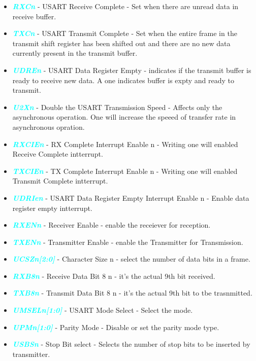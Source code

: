 \documentclass{article}
\newcommand{\bitFormat}[1]{\emph{\textbf{\textcolor{cyan}{#1}}}}
\begin{document}
\begin{itemize}
    \item \bitFormat{RXCn} - USART Receive Complete - Set when there are unread data in receive buffer.
    \item \bitFormat{TXCn} - USART Transmit Complete - Set when the entire frame in the transmit shift register has been shifted out and there are no new data currently present in the transmit buffer.
    \item \bitFormat{UDREn} - USART Data Register Empty - indicates if the transmit buffer is ready to receive new data. A one indicates buffer is expty and ready to transmit.
    \item \bitFormat{U2Xn} - Double the USART Transmission Speed - Affects only the asynchronous operation. One will increase the speeed of transfer rate in asynchronous opration.
    \item \bitFormat{RXCIEn} - RX Complete Interrupt Enable n - Writing one will enabled Receive Complete intterrupt.
    \item \bitFormat{TXCIEn} - TX Complete Interrupt Enable n - Writing one will enabled Transmit Complete intterrupt.
    \item \bitFormat{UDRIen} - USART Data Register Empty Interrupt Enable n - Enable data register empty intterrupt.
    \item \bitFormat{RXENn} - Receiver Enable - enable the receiever for reception.
    \item \bitFormat{TXENn} - Transmitter Enable - enable the Transmitter for Transmission.
    \item \bitFormat{UCSZn[2:0]} - Character Size n - select the number of data bits in a frame.
    \item \bitFormat{RXB8n} - Receive Data Bit 8 n - it's the actual 9th bit received.
    \item \bitFormat{TXB8n} - Transmit Data Bit 8 n -  it's the actual 9th bit to tbe trasnmitted.
    \item \bitFormat{UMSELn[1:0]} - USART Mode Select - Select the mode.
    \item \bitFormat{UPMn[1:0]} - Parity Mode - Disable or set the parity mode type.
    \item \bitFormat{USBSn} - Stop Bit select - Selects the number of stop bits to be inserted by transmitter.
\end{itemize}
\end{document}
